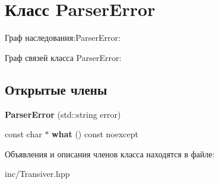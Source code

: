 \hypertarget{classParserError}{}\section{Класс Parser\+Error}
\label{classParserError}


Граф наследования\+:Parser\+Error\+:


Граф связей класса Parser\+Error\+:
\subsection*{Открытые члены}
\begin{DoxyCompactItemize}
\item 
\mbox{\label{classParserError_a8dbf6219e488c968a084c642b7d02e29}} 
{\bfseries Parser\+Error} (std\+::string error)
\item 
\mbox{\label{classParserError_a0619ad4b75ee957191da382feaba638b}} 
const char $\ast$ {\bfseries what} () const noexcept
\end{DoxyCompactItemize}


Объявления и описания членов класса находятся в файле\+:\begin{DoxyCompactItemize}
\item 
inc/Transiver.\+hpp\end{DoxyCompactItemize}
